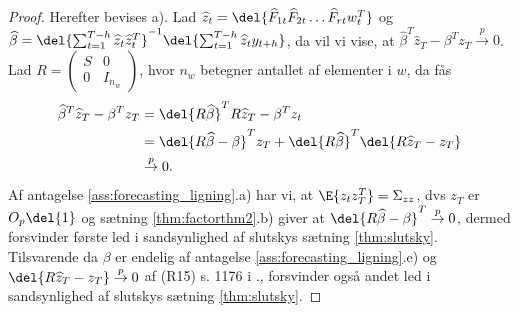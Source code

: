 \begin{proof}
Herefter bevises a).
Lad \(\widehat{z}_t = \del{\widehat{F}_{1t} \widehat{F}_{2t} \dots \widehat{F}_{rt} w_t^T}\) og \(\widehat{\beta} = \del{\sum_{t=1}^{T-h} \widehat{z}_t \widehat{z}_t^T}^{-1} \del{\sum_{t=1}^{T-h} \widehat{z}_t y_{t+h}}\), da vil vi vise, at \(\widehat{\beta}^T \widehat{z}_T - \beta^T z_T \overset{p}{\rightarrow} 0\).
Lad \(R = \begin{pmatrix}
S & 0 \\ 0 & I_{n_w}
\end{pmatrix}\), hvor \(n_w\) betegner antallet af elementer i \(w\), da fås
\begin{align*}
\widehat{\beta}^T \widehat{z}_T - \beta^T z_T &= \del{R \widehat{\beta}}^T R \widehat{z}_T - \beta^T z_t \\
&= \del{R \widehat{\beta} - \beta}^T z_T + \del{R \widehat{\beta}}^T \del{R \widehat{z}_T - z_T} \\
&\overset{p}{\rightarrow} 0.
\end{align*}
Af antagelse \ref{ass:forecasting_ligning}.a) har vi, at \(\E{z_t z_T^T} = \Sigma_{zz}\), dvs \(z_T\) er \(O_p \del{1}\) og sætning \ref{thm:factorthm2}.b) giver at \(\del{R \widehat{\beta} - \beta}^T \overset{p}{\rightarrow} 0\), dermed forsvinder første led i sandsynlighed af slutskys sætning \ref{thm:slutsky}.
Tilsvarende da \(\beta\) er endelig af antagelse \ref{ass:forecasting_ligning}.e) og \(\del{R \widehat{z}_T - z_T} \overset{p}{\rightarrow} 0\) af (R15) s. 1176 i \citep{stock_watson_2002a}., forsvinder også andet led i sandsynlighed af slutskys sætning \ref{thm:slutsky}. 
\end{proof}

